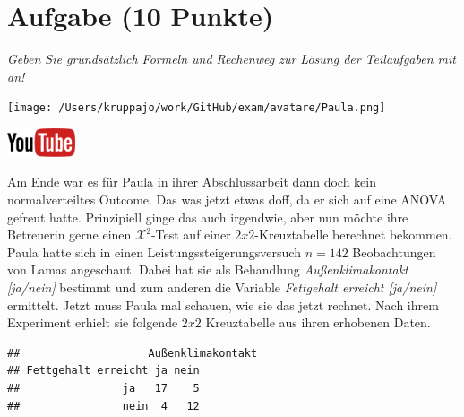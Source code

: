 \documentclass[a4paper, 9pt]{scrartcl}\usepackage[]{graphicx}\usepackage[]{xcolor}
\makeatletter
\newenvironment{kframe}{%
 \def\at@end@of@kframe{}%
 \ifinner\ifhmode%
  \def\at@end@of@kframe{\end{minipage}}%
  \begin{minipage}{\columnwidth}%
 \fi\fi%
 \def\FrameCommand##1{\hskip\@totalleftmargin \hskip-\fboxsep
 \colorbox{shadecolor}{##1}\hskip-\fboxsep
     \hskip-\linewidth \hskip-\@totalleftmargin \hskip\columnwidth}%
 \MakeFramed {\advance\hsize-\width
   \@totalleftmargin\z@ \linewidth\hsize
   \@setminipage}}%
 {\par\unskip\endMakeFramed%
 \at@end@of@kframe}
\newenvironment{knitrout}{}{} %
\makeatother
\begin{document}
\section{Aufgabe \hfill (10 Punkte)}

\textit{Geben Sie grundsätzlich Formeln und Rechenweg zur Lösung der Teilaufgaben mit an!} \\[1Ex]
 

 
\begin{minipage}[t]{0.5\textwidth}
\texttt{[image: /Users/kruppajo/work/GitHub/exam/avatare/Paula.png]}
\end{minipage}
\begin{minipage}[t]{0.5\textwidth}
\hfill
\href{https://youtu.be/ghArbetOr_E}{\includegraphics[width = 2cm]{img/youtube}}\\[1Ex]
\end{minipage}
\vspace{1ex}



Am Ende war es für Paula in ihrer Abschlussarbeit dann doch kein normalverteiltes Outcome. Das was jetzt etwas doff, da er sich auf eine ANOVA gefreut hatte. Prinzipiell ginge das auch irgendwie, aber nun möchte ihre Betreuerin gerne einen $\mathcal{X}^2$-Test auf einer $2x2$-Kreuztabelle berechnet bekommen. Paula hatte sich in einen Leistungssteigerungsversuch $n = 142$ Beobachtungen von Lamas angeschaut. Dabei hat sie als Behandlung \textit{Außenklimakontakt [ja/nein]} bestimmt und zum anderen die Variable \textit{Fettgehalt erreicht [ja/nein]} ermittelt. Jetzt muss Paula mal schauen, wie sie das jetzt rechnet. Nach ihrem Experiment erhielt sie folgende $2x2$ Kreuztabelle aus ihren erhobenen Daten.

\begin{knitrout}
\color{fgcolor}\begin{kframe}
\begin{verbatim}
##                    Außenklimakontakt
## Fettgehalt erreicht ja nein
##                ja   17    5
##                nein  4   12
\end{verbatim}
\end{kframe}
\end{knitrout}
\end{document}
